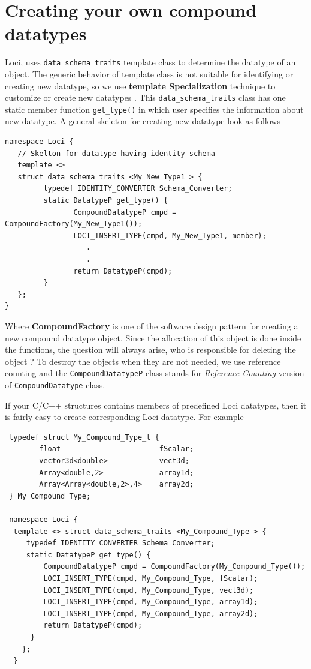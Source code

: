 \section {Creating your own compound datatypes}
%
Loci, uses {\tt data\_schema\_traits} template class to determine
the datatype of an object. The generic behavior of template class is
not suitable for identifying or creating new datatype, so we use {\bf
  template Specialization } technique to customize or create new
datatypes . This {\tt data\_schema\_traits} class has one static
member function {\tt get\_type()} in which user specifies the
information about new datatype. A general skeleton for creating new
datatype look as follows
\begin{verbatim}
namespace Loci {
   // Skelton for datatype having identity schema
   template <>
   struct data_schema_traits <My_New_Type1 > {
         typedef IDENTITY_CONVERTER Schema_Converter;
         static DatatypeP get_type() {
                CompoundDatatypeP cmpd = CompoundFactory(My_New_Type1());
                LOCI_INSERT_TYPE(cmpd, My_New_Type1, member);
                   .
                   .
                return DatatypeP(cmpd);
         }
   };
}
\end{verbatim}
%
Where {\bf CompoundFactory} is one of the software design pattern for creating a 
new compound datatype object. Since the allocation of this object is done inside
the functions, the question will always arise, who is responsible for deleting
the object ? To destroy the objects when they are not needed, we use reference counting and the 
{\tt CompoundDatatypeP} class stands for {\em Reference Counting} version of
{\tt CompoundDatatype} class.
%
\par If your C/C++ structures contains members of predefined Loci datatypes, then it
is fairly easy to create corresponding Loci datatype. For example
\begin{verbatim}
 typedef struct My_Compound_Type_t {
        float                       fScalar;      
        vector3d<double>            vect3d;
        Array<double,2>             array1d;
        Array<Array<double,2>,4>    array2d;
 } My_Compound_Type;

 namespace Loci {
  template <> struct data_schema_traits <My_Compound_Type > {
     typedef IDENTITY_CONVERTER Schema_Converter;
     static DatatypeP get_type() {
         CompoundDatatypeP cmpd = CompoundFactory(My_Compound_Type());
         LOCI_INSERT_TYPE(cmpd, My_Compound_Type, fScalar);
         LOCI_INSERT_TYPE(cmpd, My_Compound_Type, vect3d);
         LOCI_INSERT_TYPE(cmpd, My_Compound_Type, array1d);
         LOCI_INSERT_TYPE(cmpd, My_Compound_Type, array2d);
         return DatatypeP(cmpd);
      }
    };
  }
\end{verbatim}
